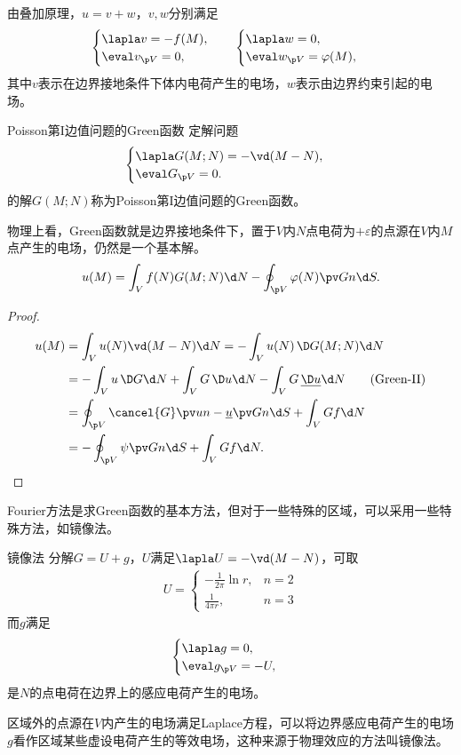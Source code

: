 由叠加原理，$u=v+w$，$v,w$分别满足
\begin{align*}
	\begin{cases}
		\lapla v=-f(M),\\
		\eval v_{\p V}=0,
	\end{cases}\quad
	\begin{cases}
		\lapla w=0,\\
		\eval w_{\p V}=\varphi(M),
	\end{cases}
\end{align*}
其中$v$表示在边界接地条件下体内电荷产生的电场，$w$表示由边界约束引起的电场。
\begin{definition}{Poisson第I边值问题的Green函数}{}
	定解问题
	\begin{align}
		\begin{cases}
			\lapla G(M;N)=-\vd(M-N),\\
			\eval G_{\p V}=0.
		\end{cases}
	\end{align}
	的解$G(M;N)$称为Poisson第I边值问题的Green函数。
\end{definition}
物理上看，Green函数就是边界接地条件下，置于$V$内$N$点电荷为$+\varepsilon$的点源在$V$内$M$点产生的电场，仍然是一个基本解。
\begin{align}
	u(M)=\int_Vf(N)G(M;N)\d N-\oint_{\p V}\varphi(N)\pv Gn\d S.
\end{align}
\begin{proof}
	\begin{align*}
		u(M)&=\int_Vu(N)\vd(M-N)\d N=-\int_Vu(N)\,\D G(M;N)\d N\\
		&=-\int_V u\,\D G\d N+\int_VG\,\D u\d N-\int_VG\,\underline{\D u}\d N\tag{Green-II}\\
		&=\oint_{\p V}\cancel{G}\pv un-\underline{u}\pv Gn\d S+\int_VG f\d N\\
		&=-\oint_{\p V}\psi\pv Gn\d S+\int_VGf\d N.
	\end{align*}
\end{proof}
Fourier方法是求Green函数的基本方法，但对于一些特殊的区域，可以采用一些特殊方法，如镜像法。
\begin{method}{镜像法}{}
	分解$G=U+g$，$U$满足$\lapla U=-\vd(M-N)$，可取
	\begin{align*}
		U=\begin{cases}
			-\frac1{2\pi}\ln r,&n=2\\[1ex]
			\frac1{4\pi r},&n= 3
		\end{cases}
	\end{align*}
	而$g$满足 
	\[
		\begin{cases}
			\lapla g=0,\\
			\eval g_{\p V}=-U,
		\end{cases}
	\]
	是$N$的点电荷在边界上的感应电荷产生的电场。
	
	区域外的点源在$V$内产生的电场满足Laplace方程，可以将边界感应电荷产生的电场$g$看作区域某些虚设电荷产生的等效电场，这种来源于物理效应的方法叫镜像法。%
\end{method}
